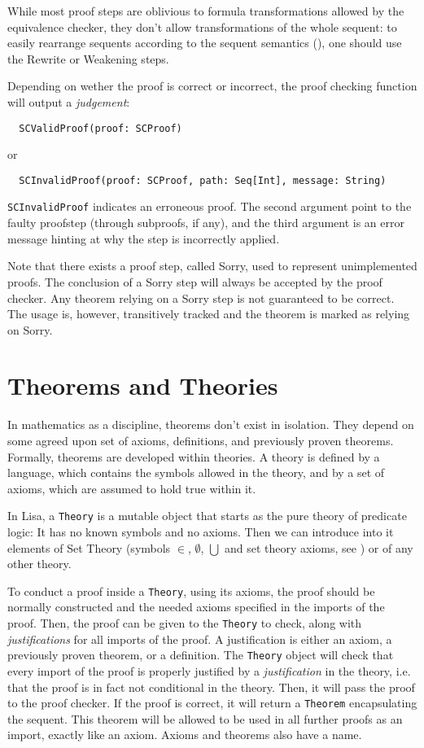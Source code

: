 While most proof steps are oblivious to formula transformations allowed by the equivalence checker, they don't allow transformations of the whole sequent: to easily rearrange sequents according to the sequent semantics (), one should use the Rewrite or Weakening steps.

Depending on wether the proof is correct or incorrect, the proof checking function will output a \textit{judgement}:
\begin{lstlisting}
  SCValidProof(proof: SCProof)
\end{lstlisting}
or
\begin{lstlisting}
  SCInvalidProof(proof: SCProof, path: Seq[Int], message: String)
\end{lstlisting}

\lstinline|SCInvalidProof|{} indicates an erroneous proof. The second argument point to the faulty proofstep (through subproofs, if any), and the third argument is an error message hinting at why the step is incorrectly applied.

Note that there exists a proof step, called Sorry, used to  represent unimplemented proofs. The conclusion of a Sorry step will always be accepted by the proof checker. Any theorem relying on a Sorry step is not guaranteed to be correct. The usage is, however, transitively tracked and the theorem is marked as relying on Sorry.

\section{Theorems and Theories}
\label{sec:TheoremsAndTheories}

In mathematics as a discipline, theorems don't exist in isolation. They depend on some agreed upon set of axioms, definitions, and previously proven theorems. Formally, theorems are developed within theories. A theory is defined by a language, which contains the symbols allowed in the theory, and by a set of axioms, which are assumed to hold true within it.

In Lisa, a \lstinline|Theory|{} is a mutable object that starts as the pure theory of predicate logic: It has no known symbols and no axioms. Then we can introduce into it elements of Set Theory (symbols $\in$, $\emptyset$, $\bigcup$ and set theory axioms, see ) or of any other theory.

To conduct a proof inside a \lstinline|Theory|{}, using its axioms, the proof should be normally constructed and the needed axioms specified in the imports of the proof. Then, the proof can be given to the \lstinline|Theory|{} to check, along with \textit{justifications} for all imports of the proof. A justification is either an axiom, a previously proven theorem, or a definition. The \lstinline|Theory|{} object will check that every import of the proof is properly justified by a \textit{justification} in the theory, i.e. that the proof is in fact not conditional in the theory. Then, it will pass the proof to the proof checker. If the proof is correct, it will return a \lstinline|Theorem|{} encapsulating the sequent. This theorem will be allowed to be used in all further proofs as an import, exactly like an axiom. Axioms and theorems also have a name.

